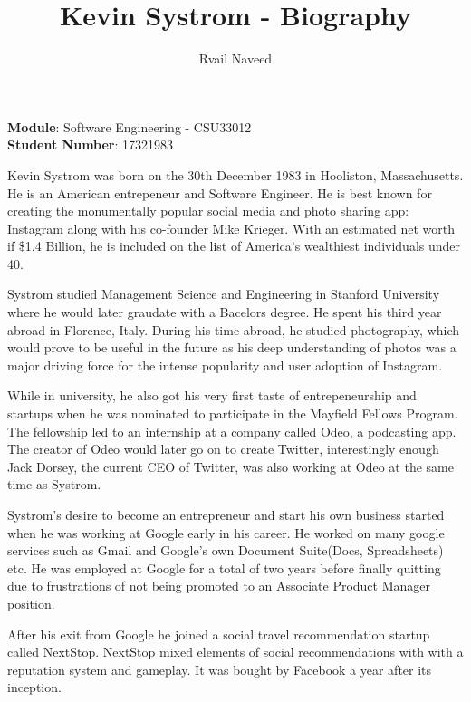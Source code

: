 \documentclass[12pt]{article}
\title{\textbf{Kevin  Systrom -  Biography}}
\author{Rvail Naveed}
\date{}
\begin{document}
    \maketitle

    \begin{center}
        \textbf{Module}: Software Engineering - CSU33012 \\
        \textbf{Student Number}: 17321983 
    \end{center}

    \newpage

    Kevin Systrom was born on the 30th December 1983 in Hooliston, Massachusetts. He is 
    an American entrepeneur and Software Engineer. He is best known for creating the monumentally
    popular social media and photo sharing app: Instagram along with his co-founder Mike Krieger. With an estimated net
    worth if \$1.4 Billion, he is included on the list of America's wealthiest individuals under 40.

    Systrom studied Management Science and Engineering in Stanford University 
    where he would later graudate with a Bacelors degree. He spent his third year abroad in Florence, Italy.
    During his time abroad, he studied photography, which would prove to be useful in the future as his deep understanding of photos
    was a major driving force for the intense popularity and user adoption of Instagram.

    While in university, 
    he also got his very first taste of entrepeneurship 
    and startups when he was nominated to participate in the Mayfield Fellows Program. 
    The fellowship led to an internship at a company called Odeo, a podcasting app. The creator of Odeo
    would later go on to create Twitter, interestingly enough Jack Dorsey, the current CEO of Twitter, 
    was also working at Odeo at the same time as Systrom.

    Systrom's desire to become an entrepreneur
    and start his own business started when he was working at Google early in his career. He worked on many google services such as Gmail and Google's own
    Document Suite(Docs, Spreadsheets) etc. He was employed at Google for a total of two years before finally quitting
    due to frustrations of not being promoted to an Associate Product Manager position.

    After his exit from Google he joined a social travel recommendation startup called 
    NextStop. NextStop mixed elements of social recommendations with
    with a reputation system and gameplay. It was bought by Facebook a year after its inception.
\end{document}
